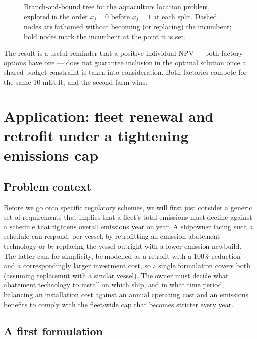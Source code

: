 \begin{figure}[htbp]
{%
}
\caption{Branch-and-bound tree for the aquaculture location problem, explored in the order $x_j=0$ before $x_j=1$ at each split. Dashed nodes are fathomed without becoming (or replacing) the incumbent; bold nodes mark the incumbent at the point it is set.}
\label{fig:bnb-tree}
\end{figure}

The result is a useful reminder that a positive individual NPV --- both
factory options have one --- does not guarantee inclusion in the optimal
solution once a shared budget constraint is taken into consideration. Both factories
compete for the same 10 mEUR, and the second farm
wins.

\section{Application: fleet renewal and retrofit under a tightening emissions cap}
\label{sec:fleet-retrofit}

\subsection{Problem context}

Before we go onto specific regulatory schemes, we will first just consider a generic set of requirements that implies that a fleet's total emissions must decline against a schedule that tightens overall emissions year on year. A shipowner facing such a
schedule can respond, per vessel, by retrofitting an emission-abatement
technology or by replacing the vessel outright with a lower-emission
newbuild. The latter can, for simplicity, be modelled as a retrofit with a 100\%
reduction and a correspondingly larger investment cost, so a single
formulation covers both (assuming replacemnt with a similar vessel). The owner must decide what
abatement technology to install on which ship, and in what time period, balancing an installation cost against an annual operating
cost and an emissions benefits to comply with the fleet-wide cap that becomes
stricter every year.

\subsection{A first formulation}
\label{sec:fleet-model-v1}

